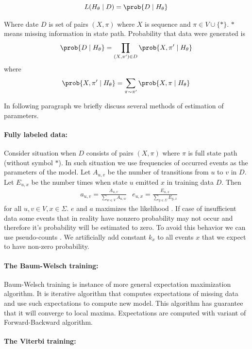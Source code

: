 \[L(H_\theta\mid D)=\prob{D\mid H_\theta}\]


Where date $D$ is set of pairs $(X,\pi)$ where $X$ is sequence and $\pi\in
V\cup\{*\}$. $*$ means missing information in state path. Probability that data
were generated is
\[
\prob{D\mid H_\theta} = \prod_{(X,\pi')\in D}\prob{X,\pi'\mid H_\theta}
\]
where
\[\prob{X,\pi'\mid H_\theta} = \sum_{\pi\sim\pi'}\prob{X,\pi\mid H_\theta}\]

In following paragraph we briefly discuss several methods of estimation of
parameters.

\paragraph{Fully labeled data:} Consider situation when $D$ consists of pairs
$(X,\pi)$ where $\pi$ is full state path (without symbol $*$). In such situation
we use frequencies of occurred events as the parameters of the model.
Let $A_{u,v}$ be the number of transitions from $u$ to $v$ in $D$.
Let $E_{u,x}$ be the number times when state $u$ emitted $x$ in training data
$D$.
Then 
\begin{align*}
&a_{u,v}=\frac{A_{u,v}}{\sum_{w\in V}A_{u,w}}
&e_{u,x}=\frac{E_{u,x}}{\sum_{y\in\Sigma}E_{y,x}}
\end{align*}
for all $u,v\in V, x\in\Sigma$. $e$ and $a$ maximizes the likelihood
\cite{Durbin1998}. If case of insufficient data some events that in reality have
nonzero probability may not occur and therefore it's probability will be
estimated to zero. To avoid this behavior we can use pseudo-counts
\cite{Durbin1998}. We artificially add constant $k_x$ to all events $x$ that we expect
to have non-zero probability.

\paragraph{The Baum-Welsch training:} Baum-Welsch training is instance of more
general expectation maximization algorithm. It is iterative algorithm that
computes expectations of missing data and use such expectations to compute 
new model. This algorithm has guarantee that it will converge to local maxima.
Expectations are computed with variant of Forward-Backward algorithm.
\paragraph{The Viterbi training: }

